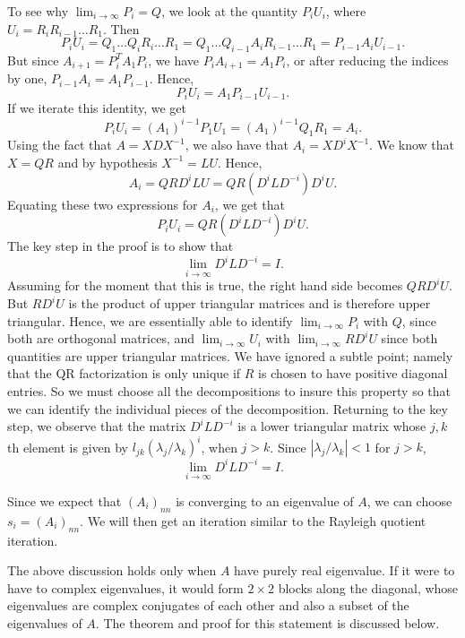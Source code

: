 \documentclass[journal]{IEEEtran}
\numberwithin{equation}{section}
\begin{document}
To see why \(\lim_{i \to \infty} P_i = Q\), we look at the quantity \(P_i U_i\), where \(U_i = R_i R_{i-1} \dots R_1\). Then
$$
P_i U_i = Q_1 \dots Q_i R_i \dots R_1 = Q_1 \dots Q_{i-1} A_i R_{i-1} \dots R_1 = P_{i-1} A_i U_{i-1}.
$$
But since \(A_{i+1} = P_i^T A_1 P_i\), we have \(P_i A_{i+1} = A_1 P_i\), or after reducing the indices by one, \(P_{i-1} A_i = A_1 P_{i-1}\). Hence,
$$
P_i U_i = A_1 P_{i-1} U_{i-1}.
$$
If we iterate this identity, we get
$$
P_i U_i = (A_1)^{i-1} P_1 U_1 = (A_1)^{i-1} Q_1 R_1 = A_i.
$$
Using the fact that \(A = XDX^{-1}\), we also have that \(A_i = XD^i X^{-1}\). We know that \(X = QR\) and by hypothesis \(X^{-1} = LU\). Hence,
$$
A_i = QR D^i LU = QR (D^i L D^{-i}) D^i U.
$$
Equating these two expressions for \(A_i\), we get that
$$
P_i U_i = QR (D^i L D^{-i}) D^i U.
$$
The key step in the proof is to show that
$$
\lim_{i \to \infty} D^i L D^{-i} = I.
$$
Assuming for the moment that this is true, the right hand side becomes \(QR D^i U\). But \(R D^i U\) is the product of upper triangular matrices and is therefore upper triangular. Hence, we are essentially able to identify \(\lim_{i \to \infty} P_i\) with \(Q\), since both are orthogonal matrices, and \(\lim_{i \to \infty} U_i\) with \(\lim_{i \to \infty} R D^i U\) since both quantities are upper triangular matrices. We have ignored a subtle point; namely that the QR factorization is only unique if \(R\) is chosen to have positive diagonal entries. So we must choose all the decompositions to insure this property so that we can identify the individual pieces of the decomposition. Returning to the key step, we observe that the matrix \(D^i L D^{-i}\) is a lower triangular matrix whose \(j, k\)th element is given by \(l_{jk} (\lambda_j / \lambda_k)^i\), when \(j > k\). Since \(|\lambda_j / \lambda_k| < 1\) for \(j > k\),
$$
\lim_{i \to \infty} D^i L D^{-i} = I.
$$

Since we expect that \((A_i)_{nn}\) is converging to an eigenvalue of \(A\), we can choose \(s_i = (A_i)_{nn}\). We will then get an iteration similar to the Rayleigh quotient iteration.

The above discussion holds only when $A$ have purely real eigenvalue. If it were to have to complex eigenvalues, it would form $2\times 2$ blocks along the diagonal, whose eigenvalues are complex conjugates of each other and also a subset of the eigenvalues of $A$. The theorem and proof for this statement is discussed below.
\end{document}
